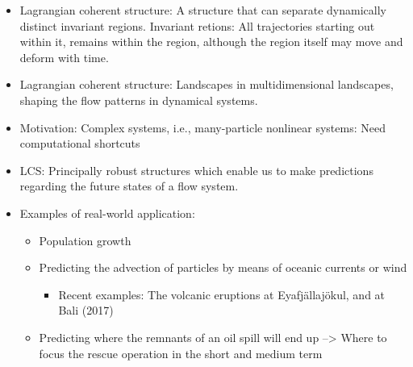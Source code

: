 \begin{framed}
    \begin{itemize}
        \item Lagrangian coherent structure: A structure that can separate dynamically
            distinct invariant regions. Invariant retions: All trajectories starting
            out within it, remains within the region, although the region itself
            may move and deform with time.
            \item Lagrangian coherent structure: Landscapes in multidimensional
                landscapes, shaping the flow patterns in dynamical systems.
                \item Motivation: Complex systems, i.e., many-particle nonlinear
                    systems: Need computational shortcuts
                    \item LCS: Principally robust structures which enable us
                        to make predictions regarding the future states of
                        a flow system.
                        \item Examples of real-world application:
                            \begin{itemize}
                                \item Population growth
\item Predicting the advection of particles by means of oceanic currents or wind
    \begin{itemize}
        \item Recent examples: The volcanic eruptions at Eyafjällajökul, and
            at Bali (2017)
    \end{itemize}
                                    \item Predicting where the remnants of an oil spill will end up --> Where to focus
                                        the rescue operation in the short and medium term
                            \end{itemize}
    \end{itemize}
\end{framed}
